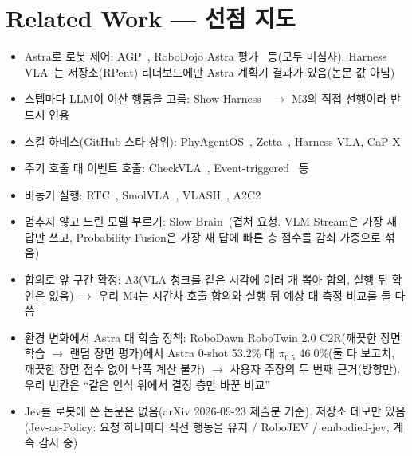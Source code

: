 \section{Related Work --- 선점 지도}
\label{sec:related}

\begin{itemize}
  \item Astra로 로봇 제어: AGP~\cite{agp2026}, RoboDojo Astra 평가~\cite{robodojo2026} 등(모두 미심사). Harness VLA~\cite{harnessvla2026}는 저장소(RPent) 리더보드에만 Astra 계획기 결과가 있음(논문 값 아님)
  \item 스텝마다 LLM이 이산 행동을 고름: Show-Harness~\cite{showharness2026} $\rightarrow$ M3의 직접 선행이라 반드시 인용
  \item 스킬 하네스(GitHub 스타 상위): PhyAgentOS~\cite{phyagentos2026}, Zetta~\cite{zetta2026}, Harness VLA, CaP-X~\cite{fu2026capx}
  \item 주기 호출 대 이벤트 호출: CheckVLA~\cite{checkvla2026}, Event-triggered~\cite{eventtrig2026} 등
  \item 비동기 실행: RTC~\cite{black2025rtc}, SmolVLA~\cite{shukor2025smolvla}, VLASH~\cite{vlash2025}, A2C2~\cite{a2c2}
  \item 멈추지 않고 느린 모델 부르기: Slow Brain~\cite{slowbrain2026}(겹쳐 요청. VLM Stream은 가장 새 답만 쓰고, Probability Fusion은 가장 새 답에 빠른 층 점수를 감쇠 가중으로 섞음)
  \item 합의로 앞 구간 확정: A3(VLA 청크를 같은 시각에 여러 개 뽑아 합의, 실행 뒤 확인은 없음) $\rightarrow$ 우리 M4는 시간차 호출 합의와 실행 뒤 예상 대 측정 비교를 둘 다 씀
  \item 환경 변화에서 Astra 대 학습 정책: RoboDawn RoboTwin 2.0 C2R(깨끗한 장면 학습 $\rightarrow$ 랜덤 장면 평가)에서 Astra 0-shot 53.2\% 대 $\pi_{0.5}$ 46.0\%(둘 다 보고치, 깨끗한 장면 점수 없어 낙폭 계산 불가) $\rightarrow$ 사용자 주장의 두 번째 근거(방향만). 우리 빈칸은 ``같은 인식 위에서 결정 층만 바꾼 비교''
  \item Jev를 로봇에 쓴 논문은 없음(arXiv 2026-09-23 제출분 기준). 저장소 데모만 있음(Jev-as-Policy: 요청 하나마다 직전 행동을 유지 / RoboJEV / embodied-jev, 계속 감시 중)
\end{itemize}
